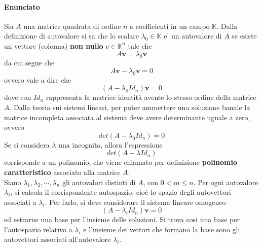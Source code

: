 \documentclass[a4paper, 10pt]{article}
\begin{document}
	\paragraph*{Enunciato}
	Sia $A$ una matrice quadrata di ordine $n$ a coefficienti in un campo $\mathbb{K}$. Dalla definizione di autovalore si 
	sa che lo scalare $\lambda_0 \in \mathbb{K}$ e' un autovalore di $A$ se esiste un vettore (colonna) \textbf{non nullo}
	$v \in \mathbb{K}^n$ tale che \[ A \textbf{v} = \lambda_0 \textbf{v} \] da cui segue che 
	\[A \textbf{v} - \lambda_0 \textbf{v} = 0 \] ovvero vale a dire che \[ (A - \lambda_0 Id_n)\textbf{v} = 0\] dove con 
	$Id_n$ rappresenta la matrice identità avente lo stesso ordine della matrice $A$. Dalla teoria sui sistemi lineari, 
	per poter ammettere una soluzione banale la matrice incompleta associata al sistema deve avere determinante uguale a
	zero, ovvero \[ det(A - \lambda_0 Id_n) = 0 \] Se si considera $\lambda$ una incognita, allora l'espressione
	\[ det(A - \lambda Id_n)\] corrisponde a un polinomio, che viene chiamato per definizione 
	\textbf{polinomio caratteristico} associato alla matrice $A$. \\ Siano $\lambda_1, \lambda_2, \cdots, \lambda_n$ gli
	autovalori distinti di $A$, con $0 < m \leq n$. Per ogni autovalore $\lambda_i$, si calcola il corrispondente
	autospazio, cioè lo spazio degli autovettori associati a $\lambda_i$. Per farlo, si deve considerare il sistema lineare
	omogeneo \[(A-\lambda_i Id_n ) \textbf{v} = 0\] ed estrarne una base per l'insieme delle soluzioni. Si trova cosi una
	base per l'autospazio relativo a $\lambda_i$ e l'insieme dei vettori che formano la base sono gli autovettori associati
	all'autovalore $\lambda_i$.
\end{document}
